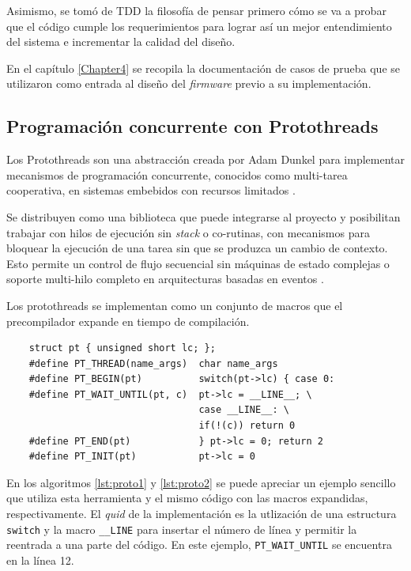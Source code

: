 Asimismo, se tomó de TDD la filosofía de pensar primero cómo se va a probar que el código cumple los requerimientos para lograr así un mejor entendimiento del sistema e incrementar la calidad del diseño.

En el capítulo \ref{Chapter4} se recopila la documentación de casos de prueba que se utilizaron como entrada al diseño del \textit{firmware} previo a su implementación.

\subsection{Programación concurrente con Protothreads} 
\label{subsec:protothreads}

Los Protothreads son una abstracción creada por Adam Dunkel para implementar mecanismos de programación concurrente, conocidos como multi-tarea cooperativa, en sistemas embebidos con recursos limitados \citep{Protothreads}. 

Se distribuyen como una biblioteca que puede integrarse al proyecto y posibilitan trabajar con hilos de ejecución sin \textit{stack} o co-rutinas, con mecanismos para bloquear la ejecución de una tarea sin que se produzca un cambio de contexto.  Esto permite un control de flujo secuencial sin máquinas de estado complejas o soporte multi-hilo completo en arquitecturas basadas en eventos \citep{dunkels06protothreads} \citep{dunkels05using}. 

Los protothreads se implementan como un conjunto de macros que el precompilador expande en tiempo de compilación.  

\begin{verbatim}
	struct pt { unsigned short lc; };
	#define PT_THREAD(name_args)  char name_args
	#define PT_BEGIN(pt)          switch(pt->lc) { case 0:
	#define PT_WAIT_UNTIL(pt, c)  pt->lc = __LINE__; \
	                              case __LINE__: \
	                              if(!(c)) return 0
	#define PT_END(pt)            } pt->lc = 0; return 2
	#define PT_INIT(pt)           pt->lc = 0
\end{verbatim}

En los algoritmos \ref{lst:proto1} y \ref{lst:proto2} se puede apreciar un ejemplo sencillo que utiliza esta herramienta y el mismo código con las macros expandidas, respectivamente. El \textit{quid} de la implementación es la utlización de una estructura \texttt{switch} y la macro \texttt{\_\_LINE} para insertar el número de línea y permitir la reentrada a una parte del código. En este ejemplo, \texttt{PT\_WAIT\_UNTIL} se encuentra en la línea 12.

